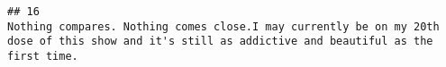 \documentclass[
]{article}
\begin{document}
\begin{verbatim}
## 16                                                                                                                                                                                                                                                                                                                                                                                                                                                                                                                                                                                                                                                                                                                                                                                                                                                                                                                                                                                                                                                                                                                                                                                                                                                                                                                                                                                                                                                                                                                                                                                                                                                                                                                                                                                                                                                                                                                                                                                                                                                               Nothing compares. Nothing comes close.I may currently be on my 20th dose of this show and it's still as addictive and beautiful as the first time.

\end{verbatim}
\end{document}
